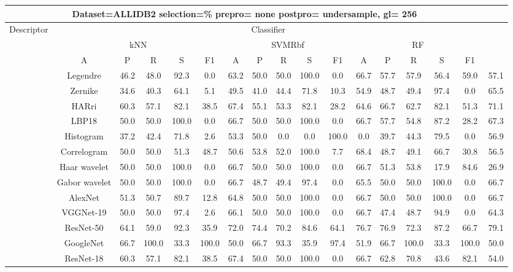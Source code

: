 \documentclass[12pt,italian]{article}
\begin{document}
\begin{tiny}
\begin{longtable}{lcccccccccccccccc}
\toprule
\multicolumn{16}{c}{Dataset=ALLIDB2 selection=\% prepro= none postpro= undersample, gl= 256} \\ 
\toprule
Descriptor & \multicolumn{15}{c}{Classifier} \\ 
& \multicolumn{5}{c}{kNN} & \multicolumn{5}{c}{SVMRbf} & \multicolumn{5}{c}{RF} \\ 
& A & P & R & S & F1 & A & P & R & S & F1 & A & P & R & S & F1 \\ 
\midrule
& Legendre & 46.2 & 48.0 & 92.3 &  0.0 & 63.2 & 50.0 & 50.0 & 100.0 &  0.0 & 66.7 & 57.7 & 57.9 & 56.4 & 59.0 & 57.1 \\ 
& Zernike & 34.6 & 40.3 & 64.1 &  5.1 & 49.5 & 41.0 & 44.4 & 71.8 & 10.3 & 54.9 & 48.7 & 49.4 & 97.4 &  0.0 & 65.5 \\ 
& HARri & 60.3 & 57.1 & 82.1 & 38.5 & 67.4 & 55.1 & 53.3 & 82.1 & 28.2 & 64.6 & 66.7 & 62.7 & 82.1 & 51.3 & 71.1 \\ 
& LBP18 & 50.0 & 50.0 & 100.0 &  0.0 & 66.7 & 50.0 & 50.0 & 100.0 &  0.0 & 66.7 & 57.7 & 54.8 & 87.2 & 28.2 & 67.3 \\ 
& Histogram & 37.2 & 42.4 & 71.8 &  2.6 & 53.3 & 50.0 &  0.0 &  0.0 & 100.0 &  0.0 & 39.7 & 44.3 & 79.5 &  0.0 & 56.9 \\ 
& Correlogram & 50.0 & 50.0 & 51.3 & 48.7 & 50.6 & 53.8 & 52.0 & 100.0 &  7.7 & 68.4 & 48.7 & 49.1 & 66.7 & 30.8 & 56.5 \\ 
& Haar wavelet & 50.0 & 50.0 & 100.0 &  0.0 & 66.7 & 50.0 & 50.0 & 100.0 &  0.0 & 66.7 & 51.3 & 53.8 & 17.9 & 84.6 & 26.9 \\ 
& Gabor wavelet & 50.0 & 50.0 & 100.0 &  0.0 & 66.7 & 48.7 & 49.4 & 97.4 &  0.0 & 65.5 & 50.0 & 50.0 & 100.0 &  0.0 & 66.7 \\ 
& AlexNet & 51.3 & 50.7 & 89.7 & 12.8 & 64.8 & 50.0 & 50.0 & 100.0 &  0.0 & 66.7 & 50.0 & 50.0 & 100.0 &  0.0 & 66.7 \\ 
& VGGNet-19 & 50.0 & 50.0 & 97.4 &  2.6 & 66.1 & 50.0 & 50.0 & 100.0 &  0.0 & 66.7 & 47.4 & 48.7 & 94.9 &  0.0 & 64.3 \\ 
& ResNet-50 & 64.1 & 59.0 & 92.3 & 35.9 & 72.0 & 74.4 & 70.2 & 84.6 & 64.1 & 76.7 & 76.9 & 72.3 & 87.2 & 66.7 & 79.1 \\ 
& GoogleNet & 66.7 & 100.0 & 33.3 & 100.0 & 50.0 & 66.7 & 93.3 & 35.9 & 97.4 & 51.9 & 66.7 & 100.0 & 33.3 & 100.0 & 50.0 \\ 
& ResNet-18 & 60.3 & 57.1 & 82.1 & 38.5 & 67.4 & 50.0 & 50.0 & 100.0 &  0.0 & 66.7 & 62.8 & 70.8 & 43.6 & 82.1 & 54.0 \\ 

\end{longtable}
\end{tiny}
\end{document}
